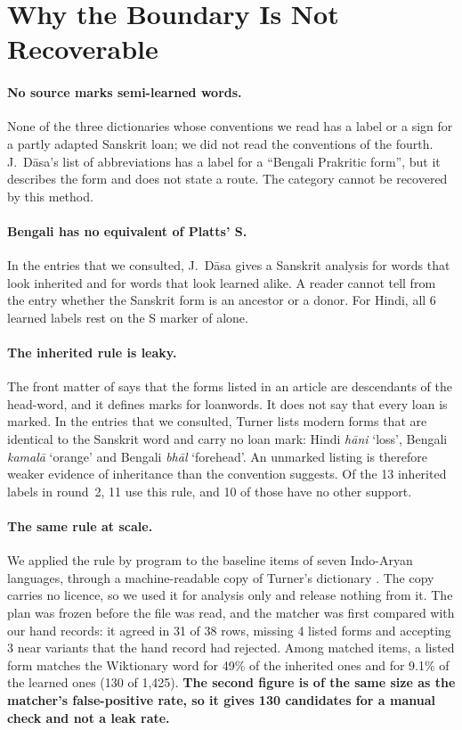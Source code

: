 \documentclass[11pt]{article}
\newcommand{\gl}[1]{`#1'}
\begin{document}
\section{Why the Boundary Is Not Recoverable}
\label{sec:why}

\paragraph{No source marks semi-learned words.} None of the three dictionaries whose conventions we read has a label or a sign for a partly adapted Sanskrit loan; we did not read the conventions of the fourth. J.~D\=asa's list of abbreviations has a label for a ``Bengali Prakritic form'', but it describes the form and does not state a route. The category cannot be recovered by this method.

\paragraph{Bengali has no equivalent of Platts' S.} In the entries that we consulted, J.~D\=asa gives a Sanskrit analysis for words that look inherited and for words that look learned alike. A reader cannot tell from the entry whether the Sanskrit form is an ancestor or a donor. For Hindi, all 6 learned labels rest on the S marker of \citet{platts1884} alone.

\paragraph{The inherited rule is leaky.} The front matter of \citet{turner1966cdial} says that the forms listed in an article are descendants of the head-word, and it defines marks for loanwords. It does not say that every loan is marked. In the entries that we consulted, Turner lists modern forms that are identical to the Sanskrit word and carry no loan mark: Hindi \textit{h\=ani} \gl{loss}, Bengali \textit{kamal\=a} \gl{orange} and Bengali \textit{bh\=al} \gl{forehead}. An unmarked listing is therefore weaker evidence of inheritance than the convention suggests. Of the 13 inherited labels in round~2, 11 use this rule, and 10 of those have no other support.

\paragraph{The same rule at scale.} We applied the rule by program to the baseline items of seven Indo-Aryan languages, through a machine-readable copy of Turner's dictionary \citep{arora2023jambu}. The copy carries no licence, so we used it for analysis only and release nothing from it. The plan was frozen before the file was read, and the matcher was first compared with our hand records: it agreed in 31 of 38 rows, missing 4 listed forms and accepting 3 near variants that the hand record had rejected. Among matched items, a listed form matches the Wiktionary word for 49\% of the inherited ones and for 9.1\% of the learned ones (130 of 1,425). \textbf{The second figure is of the same size as the matcher's false-positive rate, so it gives 130 candidates for a manual check and not a leak rate.}
\end{document}
